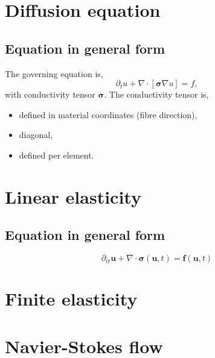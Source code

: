\documentclass[
10pt, %
a4paper, %
oneside, %
headinclude,footinclude, %
BCOR5mm, %
]{scrartcl}
\begin{document}
\section{Diffusion equation}
%
\subsection{Equation in general form}
%
The governing equation is,
%
\begin{equation}
    \partial_t u + \nabla \cdot [\boldsymbol{\sigma} \nabla u] = f,
\end{equation}
%
with conductivity tensor $\boldsymbol{\sigma}$. The conductivity tensor is,
%
\begin{itemize}
    \item{defined in material coordinates (fibre direction),}
    \item{diagonal,}
    \item{defined per element.}
\end{itemize}
%
%
%
%
%
%
%
%
%
%
%
%
%
%
\clearpage
%
\section{Linear elasticity}
%
\subsection{Equation in general form}
%
\begin{equation}
    \partial_{tt} \boldsymbol{u} + \nabla \cdot \boldsymbol{\sigma} (\boldsymbol{u}, t) = \boldsymbol{f} (\boldsymbol{u}, t)
\end{equation}
%
%
%
%
\clearpage
%
\section{Finite elasticity}
%
%
%
%
\clearpage
%
\section{Navier-Stokes flow}
%
%
%
%
\clearpage
%
\end{document}

